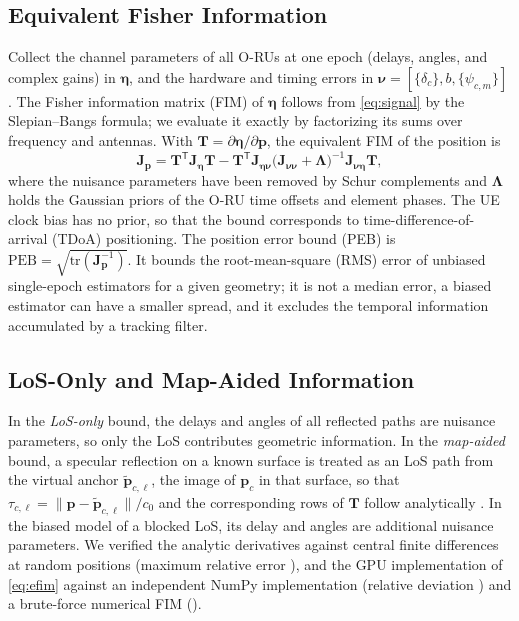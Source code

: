\documentclass[journal]{IEEEtran}
\begin{document}
\subsection{Equivalent Fisher Information}
Collect the channel parameters of all O-RUs at one epoch (delays, angles,
and complex gains) in $\boldsymbol\eta$, and the hardware and timing
errors in $\boldsymbol\nu=[\{\delta_c\},b,\{\psi_{c,m}\}]$. The Fisher
information matrix (FIM) of $\boldsymbol\eta$ follows from
\eqref{eq:signal} by the Slepian--Bangs formula; we evaluate it exactly
by factorizing its sums over frequency and antennas. With
$\mathbf T=\partial\boldsymbol\eta/\partial\mathbf p$, the equivalent FIM
of the position is
\begin{equation}
\mathbf J_{\mathbf p}=\mathbf T^{\mathsf T}\mathbf J_{\boldsymbol\eta}\mathbf T
-\mathbf T^{\mathsf T}\mathbf J_{\boldsymbol\eta\boldsymbol\nu}
\bigl(\mathbf J_{\boldsymbol\nu\boldsymbol\nu}+\boldsymbol\Lambda\bigr)^{-1}
\mathbf J_{\boldsymbol\nu\boldsymbol\eta}\mathbf T,
\label{eq:efim}
\end{equation}
where the nuisance parameters have been removed by Schur complements and
$\boldsymbol\Lambda$ holds the Gaussian priors of the O-RU time offsets
and element phases. The UE clock bias has no prior, so that the bound
corresponds to time-difference-of-arrival (TDoA) positioning. The
position error bound (PEB) is
$\mathrm{PEB}=\sqrt{\mathrm{tr}(\mathbf J_{\mathbf p}^{-1})}$. It bounds
the root-mean-square (RMS) error of unbiased single-epoch estimators for
a given geometry; it is not a median error, a biased estimator can have a
smaller spread, and it excludes the temporal information accumulated by
a tracking filter.

\subsection{LoS-Only and Map-Aided Information}
In the \emph{LoS-only} bound, the delays and angles of all reflected
paths are nuisance parameters, so only the LoS contributes geometric
information. In the \emph{map-aided} bound, a specular reflection on a
known surface is treated as an LoS path from the virtual anchor
$\tilde{\mathbf p}_{c,\ell}$, the image of $\mathbf p_c$ in that surface,
so that $\tau_{c,\ell}=\|\mathbf p-\tilde{\mathbf p}_{c,\ell}\|/c_0$ and
the corresponding rows of $\mathbf T$ follow analytically
\cite{leitinger2015evaluation}. In the biased model of a blocked LoS, its
delay and angles are additional nuisance parameters. We verified the
analytic derivatives against central finite differences at
\pDerivFdNumUe{} random positions (maximum relative error
\pDerivFdMaxRel), and the GPU implementation of \eqref{eq:efim} against
an independent NumPy implementation (relative deviation \pFimJobErr) and
a brute-force numerical FIM (\pFimToyErr).
\end{document}
